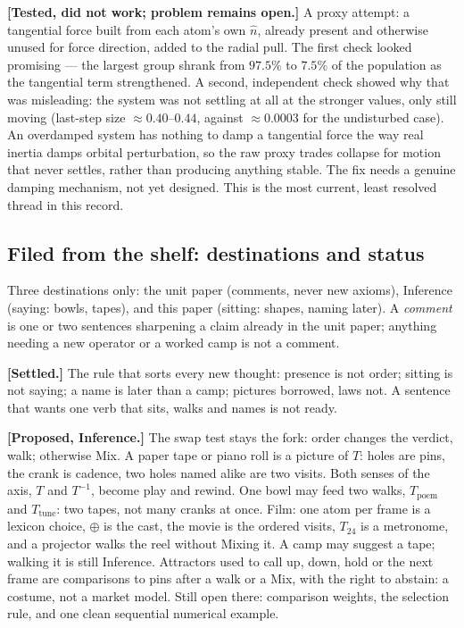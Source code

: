 \documentclass[12pt, a4paper]{article}
\begin{document}
\textbf{[Tested, did not work; problem remains open.]} A proxy
attempt: a tangential force built from each atom's own $\hat n$,
already present and otherwise unused for force direction, added to
the radial pull. The first check looked promising --- the largest
group shrank from $97.5\%$ to $7.5\%$ of the population as the
tangential term strengthened. A second, independent check showed why
that was misleading: the system was not settling at all at the
stronger values, only still moving (last-step size $\approx0.40$--$0.44$,
against $\approx0.0003$ for the undisturbed case). An overdamped
system has nothing to damp a tangential force the way real inertia
damps orbital perturbation, so the raw proxy trades collapse for
motion that never settles, rather than producing anything stable.
The fix needs a genuine damping mechanism, not yet designed. This is
the most current, least resolved thread in this record.



\subsection*{Filed from the shelf: destinations and status}

Three destinations only: the unit paper (comments, never new axioms),
Inference (saying: bowls, tapes), and this paper (sitting: shapes,
naming later). A \emph{comment} is one or two sentences sharpening a
claim already in the unit paper; anything needing a new operator or
a worked camp is not a comment.

\textbf{[Settled.]} The rule that sorts every new thought: presence is
not order; sitting is not saying; a name is later than a camp;
pictures borrowed, laws not. A sentence that wants one verb that
sits, walks and names is not ready.

\textbf{[Proposed, Inference.]} The swap test stays the fork: order
changes the verdict, walk; otherwise Mix. A paper tape or piano roll
is a picture of $T$: holes are pins, the crank is cadence, two holes
named alike are two visits. Both senses of the axis, $T$ and
$T^{-1}$, become play and rewind. One bowl may feed two walks,
$T_{\mathrm{poem}}$ and $T_{\mathrm{tune}}$: two tapes, not many
cranks at once. Film: one atom per frame is a lexicon choice,
$\oplus$ is the cast, the movie is the ordered visits, $T_{24}$ is a
metronome, and a projector walks the reel without Mixing it. A camp
may suggest a tape; walking it is still Inference. Attractors used
to call up, down, hold or the next frame are comparisons to pins
after a walk or a Mix, with the right to abstain: a costume, not a
market model. Still open there: comparison weights, the selection
rule, and one clean sequential numerical example.
\end{document}
